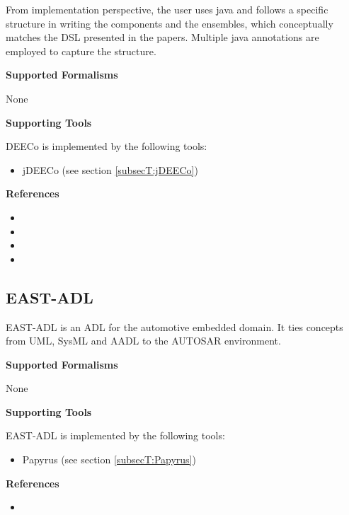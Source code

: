 From implementation perspective, the user uses java and follows a specific structure in writing the components and the ensembles, which conceptually matches the DSL presented in the papers. Multiple java annotations are employed to capture the structure.

\textbf{Supported Formalisms}

None


\textbf{Supporting Tools}

DEECo is implemented by the following tools:
\begin{itemize}
	\item jDEECo (see section \ref{subsecT:jDEECo})
\end{itemize}


\textbf{References}
\begin{itemize}
	
\item {}
	
\item {}
	
\item {}
	
\item {}
\end{itemize}



\subsection{EAST-ADL}
\label{subsecL:EAST-ADL}


EAST-ADL is an ADL for the automotive embedded domain. 
It ties concepts from UML, SysML and AADL to the AUTOSAR environment.

\textbf{Supported Formalisms}

None


\textbf{Supporting Tools}

EAST-ADL is implemented by the following tools:
\begin{itemize}
	\item Papyrus (see section \ref{subsecT:Papyrus})
\end{itemize}


\textbf{References}
\begin{itemize}
	
\item {}
\end{itemize}



